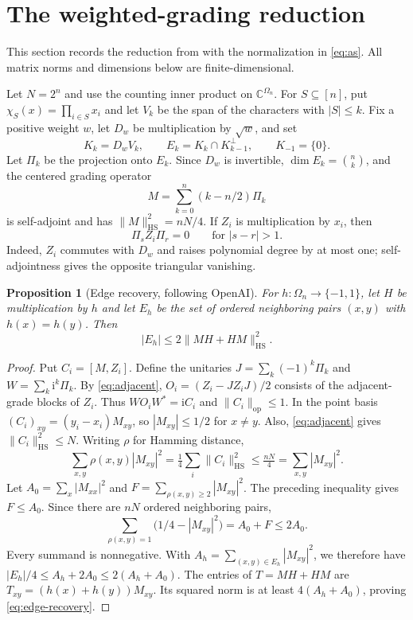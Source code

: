 \documentclass[11pt]{article}
\newtheorem{proposition}[theorem]{Proposition}
\theoremstyle{remark}
\newcommand{\HS}{\mathrm{HS}}
\newcommand{\op}{\mathrm{op}}
\begin{document}
\section{The weighted-grading reduction}\label{sec:grading}
This section records the reduction from \cite{OpenAI} with the
normalization in \eqref{eq:as}. All matrix norms and dimensions below
are finite-dimensional.

Let $N=2^n$ and use the counting inner product on $\mathbb C^{\Omega_n}$.
For $S\subseteq[n]$, put $\chi_S(x)=\prod_{i\in S}x_i$ and let $V_k$
be the span of the characters with $|S|\le k$. Fix a positive weight
$w$, let $D_w$ be multiplication by $\sqrt w$, and set
\[
 K_k=D_wV_k,\qquad E_k=K_k\cap K_{k-1}^{\perp},\qquad K_{-1}=\{0\}.
\]
Let $\Pi_k$ be the projection onto $E_k$. Since $D_w$ is invertible,
$\dim E_k=\binom nk$, and the centered grading operator
\[
 M=\sum_{k=0}^n(k-n/2)\Pi_k
\]
is self-adjoint and has $\|M\|_{\HS}^2=nN/4$.
If $Z_i$ is multiplication by $x_i$, then
\begin{equation}\label{eq:adjacent}
 \Pi_s Z_i\Pi_r=0\qquad\text{for }|s-r|>1.
\end{equation}
Indeed, $Z_i$ commutes with $D_w$ and raises polynomial degree by at most
one; self-adjointness gives the opposite triangular vanishing.

\begin{proposition}[Edge recovery, following OpenAI]\label{prop:edges}
For $h:\Omega_n\to\{-1,1\}$, let $H$ be multiplication by $h$ and
let $E_h$ be the set of ordered neighboring pairs $(x,y)$ with $h(x)=h(y)$.
Then
\begin{equation}\label{eq:edge-recovery}
 |E_h|\le2\|MH+HM\|_{\HS}^2.
\end{equation}
\end{proposition}
\begin{proof}
Put $C_i=[M,Z_i]$. Define the unitaries
$J=\sum_k(-1)^k\Pi_k$ and $W=\sum_k\mathrm{i}^k\Pi_k$.
By \eqref{eq:adjacent},
$O_i=(Z_i-JZ_iJ)/2$ consists of the adjacent-grade blocks of $Z_i$.
Thus $WO_iW^*=\mathrm{i}C_i$ and $\|C_i\|_{\op}\le1$.
In the point basis $(C_i)_{xy}=(y_i-x_i)M_{xy}$, so
$|M_{xy}|\le1/2$ for $x\ne y$.
Also, \eqref{eq:adjacent} gives $\|C_i\|_{\HS}^2\le N$.
Writing $\rho$ for Hamming distance,
\[
 \sum_{x,y}\rho(x,y)|M_{xy}|^2
 =\tfrac14\sum_i\|C_i\|_{\HS}^2
 \le\tfrac{nN}{4}=\sum_{x,y}|M_{xy}|^2.
\]
Let $A_0=\sum_x|M_{xx}|^2$ and
$F=\sum_{\rho(x,y)\ge2}|M_{xy}|^2$. The preceding inequality gives
$F\le A_0$. Since there are $nN$ ordered neighboring pairs,
\[
 \sum_{\rho(x,y)=1}\bigl(1/4-|M_{xy}|^2\bigr)=A_0+F\le2A_0.
\]
Every summand is nonnegative. With
$A_h=\sum_{(x,y)\in E_h}|M_{xy}|^2$, we therefore have
$|E_h|/4\le A_h+2A_0\le2(A_h+A_0)$.
The entries of $T=MH+HM$ are
$T_{xy}=(h(x)+h(y))M_{xy}$. Its squared norm is at least
$4(A_h+A_0)$, proving \eqref{eq:edge-recovery}.
\end{proof}
\end{document}
